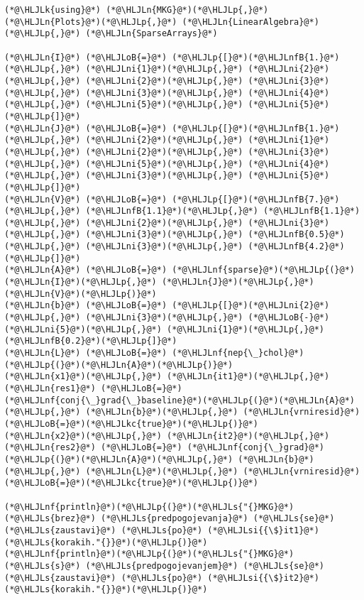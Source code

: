 \documentclass[12pt,a4paper]{article}
\newcommand{\HLJLk}[1]{\textcolor[RGB]{148,91,176}{\textbf{#1}}}
\newcommand{\HLJLkc}[1]{\textcolor[RGB]{59,151,46}{\textit{#1}}}
\newcommand{\HLJLn}[1]{#1}
\newcommand{\HLJLnf}[1]{\textcolor[RGB]{66,102,213}{#1}}
\newcommand{\HLJLs}[1]{\textcolor[RGB]{201,61,57}{#1}}
\newcommand{\HLJLsi}[1]{#1}
\newcommand{\HLJLnfB}[1]{\textcolor[RGB]{59,151,46}{#1}}
\newcommand{\HLJLni}[1]{\textcolor[RGB]{59,151,46}{#1}}
\newcommand{\HLJLoB}[1]{\textcolor[RGB]{102,102,102}{\textbf{#1}}}
\newcommand{\HLJLp}[1]{#1}
\begin{document}
\begin{lstlisting}
(*@\HLJLk{using}@*) (*@\HLJLn{MKG}@*)(*@\HLJLp{,}@*) (*@\HLJLn{Plots}@*)(*@\HLJLp{,}@*) (*@\HLJLn{LinearAlgebra}@*)(*@\HLJLp{,}@*) (*@\HLJLn{SparseArrays}@*)

(*@\HLJLn{I}@*) (*@\HLJLoB{=}@*) (*@\HLJLp{[}@*)(*@\HLJLnfB{1.}@*)(*@\HLJLp{,}@*) (*@\HLJLni{1}@*)(*@\HLJLp{,}@*) (*@\HLJLni{2}@*)(*@\HLJLp{,}@*) (*@\HLJLni{2}@*)(*@\HLJLp{,}@*) (*@\HLJLni{3}@*)(*@\HLJLp{,}@*) (*@\HLJLni{3}@*)(*@\HLJLp{,}@*) (*@\HLJLni{4}@*)(*@\HLJLp{,}@*) (*@\HLJLni{5}@*)(*@\HLJLp{,}@*) (*@\HLJLni{5}@*)(*@\HLJLp{]}@*)
(*@\HLJLn{J}@*) (*@\HLJLoB{=}@*) (*@\HLJLp{[}@*)(*@\HLJLnfB{1.}@*)(*@\HLJLp{,}@*) (*@\HLJLni{2}@*)(*@\HLJLp{,}@*) (*@\HLJLni{1}@*)(*@\HLJLp{,}@*) (*@\HLJLni{2}@*)(*@\HLJLp{,}@*) (*@\HLJLni{3}@*)(*@\HLJLp{,}@*) (*@\HLJLni{5}@*)(*@\HLJLp{,}@*) (*@\HLJLni{4}@*)(*@\HLJLp{,}@*) (*@\HLJLni{3}@*)(*@\HLJLp{,}@*) (*@\HLJLni{5}@*)(*@\HLJLp{]}@*)
(*@\HLJLn{V}@*) (*@\HLJLoB{=}@*) (*@\HLJLp{[}@*)(*@\HLJLnfB{7.}@*)(*@\HLJLp{,}@*) (*@\HLJLnfB{1.1}@*)(*@\HLJLp{,}@*) (*@\HLJLnfB{1.1}@*)(*@\HLJLp{,}@*) (*@\HLJLni{2}@*)(*@\HLJLp{,}@*) (*@\HLJLni{3}@*)(*@\HLJLp{,}@*) (*@\HLJLni{3}@*)(*@\HLJLp{,}@*) (*@\HLJLnfB{0.5}@*)(*@\HLJLp{,}@*) (*@\HLJLni{3}@*)(*@\HLJLp{,}@*) (*@\HLJLnfB{4.2}@*)(*@\HLJLp{]}@*)
(*@\HLJLn{A}@*) (*@\HLJLoB{=}@*) (*@\HLJLnf{sparse}@*)(*@\HLJLp{(}@*)(*@\HLJLn{I}@*)(*@\HLJLp{,}@*) (*@\HLJLn{J}@*)(*@\HLJLp{,}@*) (*@\HLJLn{V}@*)(*@\HLJLp{)}@*)
(*@\HLJLn{b}@*) (*@\HLJLoB{=}@*) (*@\HLJLp{[}@*)(*@\HLJLni{2}@*)(*@\HLJLp{,}@*) (*@\HLJLni{3}@*)(*@\HLJLp{,}@*) (*@\HLJLoB{-}@*)(*@\HLJLni{5}@*)(*@\HLJLp{,}@*) (*@\HLJLni{1}@*)(*@\HLJLp{,}@*) (*@\HLJLnfB{0.2}@*)(*@\HLJLp{]}@*)
(*@\HLJLn{L}@*) (*@\HLJLoB{=}@*) (*@\HLJLnf{nep{\_}chol}@*)(*@\HLJLp{(}@*)(*@\HLJLn{A}@*)(*@\HLJLp{)}@*)
(*@\HLJLn{x1}@*)(*@\HLJLp{,}@*) (*@\HLJLn{it1}@*)(*@\HLJLp{,}@*) (*@\HLJLn{res1}@*) (*@\HLJLoB{=}@*) (*@\HLJLnf{conj{\_}grad{\_}baseline}@*)(*@\HLJLp{(}@*)(*@\HLJLn{A}@*)(*@\HLJLp{,}@*) (*@\HLJLn{b}@*)(*@\HLJLp{,}@*) (*@\HLJLn{vrniresid}@*)(*@\HLJLoB{=}@*)(*@\HLJLkc{true}@*)(*@\HLJLp{)}@*)
(*@\HLJLn{x2}@*)(*@\HLJLp{,}@*) (*@\HLJLn{it2}@*)(*@\HLJLp{,}@*) (*@\HLJLn{res2}@*) (*@\HLJLoB{=}@*) (*@\HLJLnf{conj{\_}grad}@*)(*@\HLJLp{(}@*)(*@\HLJLn{A}@*)(*@\HLJLp{,}@*) (*@\HLJLn{b}@*)(*@\HLJLp{,}@*) (*@\HLJLn{L}@*)(*@\HLJLp{,}@*) (*@\HLJLn{vrniresid}@*)(*@\HLJLoB{=}@*)(*@\HLJLkc{true}@*)(*@\HLJLp{)}@*)

(*@\HLJLnf{println}@*)(*@\HLJLp{(}@*)(*@\HLJLs{"{}MKG}@*) (*@\HLJLs{brez}@*) (*@\HLJLs{predpogojevanja}@*) (*@\HLJLs{se}@*) (*@\HLJLs{zaustavi}@*) (*@\HLJLs{po}@*) (*@\HLJLsi{{\$}it1}@*) (*@\HLJLs{korakih."{}}@*)(*@\HLJLp{)}@*)
(*@\HLJLnf{println}@*)(*@\HLJLp{(}@*)(*@\HLJLs{"{}MKG}@*) (*@\HLJLs{s}@*) (*@\HLJLs{predpogojevanjem}@*) (*@\HLJLs{se}@*) (*@\HLJLs{zaustavi}@*) (*@\HLJLs{po}@*) (*@\HLJLsi{{\$}it2}@*) (*@\HLJLs{korakih."{}}@*)(*@\HLJLp{)}@*)
\end{lstlisting}
\end{document}
